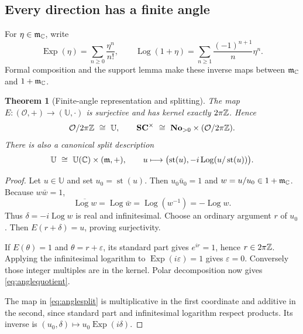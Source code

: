 \documentclass[11pt,letterpaper]{article}
\newtheorem{theorem}{Theorem}[section]
\theoremstyle{definition}
\theoremstyle{remark}
\newcommand{\No}{\mathbf{No}}
\newcommand{\SC}{\mathbf{SC}}
\newcommand{\OO}{\mathcal O}\newcommand{\mm}{\mathfrak m}
\newcommand{\U}{\mathbb U}\newcommand{\PP}{\mathbb P}
\newcommand{\st}{\operatorname{st}}
\newcommand{\Exp}{\operatorname{Exp}}\newcommand{\Log}{\operatorname{Log}}
\numberwithin{equation}{section}
\begin{document}
\subsection{Every direction has a finite angle}
For $\eta\in\mm_\C$, write
\[
 \Exp(\eta)=\sum_{n\ge0}\frac{\eta^n}{n!},\qquad
 \Log(1+\eta)=\sum_{n\ge1}\frac{(-1)^{n+1}}n\eta^n.
\]
Formal composition and the support lemma make these inverse maps between $\mm_\C$ and $1+\mm_\C$.

\begin{theorem}[Finite-angle representation and splitting]\label{thm:phase}
The map $E:(\OO,+)\to(\U,\cdot)$ is surjective and has kernel exactly $2\pi\mathbb Z$. Hence
\begin{equation}\label{eq:anglequotient}
 \OO/2\pi\Z\ \cong\ \U,
 \qquad
 \SC^\times\ \cong\ \No_{>0}\times(\OO/2\pi\Z).
\end{equation}
There is also a canonical split description
\begin{equation}\label{eq:anglesplit}
 \U\ \cong\ \U(\C)\times(\mm,+),
 \qquad u\longmapsto\bigl(\st(u),-i\Log(u/\st(u))\bigr).
\end{equation}
\end{theorem}
\begin{proof}
Let $u\in\U$ and set $u_0=\st(u)$. Then $u_0\bar u_0=1$ and $w=u/u_0\in1+\mm_\C$. Because $w\bar w=1$,
\[
 \overline{\Log w}=\Log\bar w=\Log(w^{-1})=-\Log w.
\]
Thus $\delta=-i\Log w$ is real and infinitesimal. Choose an ordinary argument $r$ of $u_0$. Then $E(r+\delta)=u$, proving surjectivity.

If $E(\theta)=1$ and $\theta=r+\varepsilon$, its standard part gives $e^{ir}=1$, hence $r\in2\pi\mathbb Z$. Applying the infinitesimal logarithm to $\Exp(i\varepsilon)=1$ gives $\varepsilon=0$. Conversely those integer multiples are in the kernel. Polar decomposition now gives \eqref{eq:anglequotient}.

The map in \eqref{eq:anglesplit} is multiplicative in the first coordinate and additive in the second, since standard part and infinitesimal logarithm respect products. Its inverse is $(u_0,\delta)\mapsto u_0\Exp(i\delta)$.
\end{proof}
\end{document}

